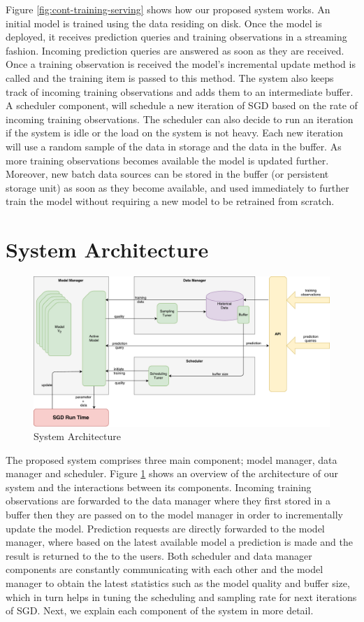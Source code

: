 \documentclass{vldb}
\begin{document}
Figure \ref{fig:cont-training-serving} shows how our proposed system works.
An initial model is trained using the data residing on disk.
Once the model is deployed, it receives prediction queries and training observations in a streaming fashion.
Incoming prediction queries are answered as soon as they are received.
Once a training observation is received the model's incremental update method is called and the training item is passed to this method.
The system also keeps track of incoming training observations and adds them to an intermediate buffer.
A scheduler component, will schedule a new iteration of SGD based on the rate of incoming training observations. 
The scheduler can also decide to run an iteration if the system is idle or the load on the system is not heavy. 
Each new iteration will use a random sample of the data in storage and the data in the buffer. 
As more training observations becomes available the model is updated further.
Moreover, new batch data sources can be stored in the buffer (or persistent storage unit) as soon as they become available, and used immediately to further train the model without requiring a new model to be retrained from scratch.


\section{System Architecture} \label{sec:system-architecutre}
\begin{figure}[t]
\centering
\includegraphics[width=\columnwidth]{../images/system-architecture-2.pdf}
\caption{System Architecture}
\label{fig:system-architecture}
\end{figure}
The proposed system comprises three main component; model manager, data manager and scheduler. 
Figure \ref{fig:system-architecture} shows an overview of the architecture of our system and the interactions between its components.
Incoming training observations are forwarded to the data manager where they first stored in a buffer then they are passed on to the model manager in order to incrementally update the model.
Prediction requests are directly forwarded to the model manager, where based on the latest available model a prediction is made and the result is returned to the to the users.
Both scheduler and data manager components are constantly communicating with each other and the model manager to obtain the latest statistics such as the model quality and buffer size, which in turn helps in tuning the scheduling and sampling rate for next iterations of SGD. 
Next, we explain each component of the system in more detail.
\end{document}
